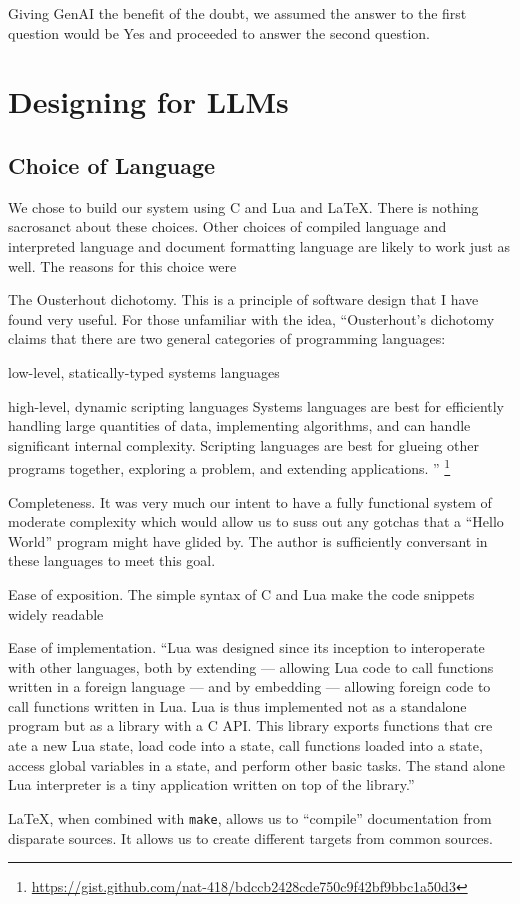 \documentclass[letterpaper,12pt]{article}
\begin{document}
{Giving GenAI the benefit of the doubt, we assumed the answer to the first
question would be Yes and proceeded to answer the second question. 

\section{Designing for LLMs}

\subsection{Choice of Language}

We chose to build our system using C and Lua and \LaTeX.  
There is nothing sacrosanct about these choices. Other 
choices of compiled language and interpreted
language and document formatting language are likely to work just as well. 
The reasons for this choice were
\be
\item The Ousterhout dichotomy. This is a principle of software design that I
  have found very useful. For those unfamiliar with the idea, 
``Ousterhout's dichotomy claims that there are two general categories of programming languages:
\be
\item low-level, statically-typed systems languages
\item high-level, dynamic scripting languages
  \ee
Systems languages are best for efficiently handling large quantities of data, implementing algorithms, and can handle significant internal complexity. Scripting languages are best for glueing other programs together, exploring a problem, and extending applications.
''
\footnote{\url{https://gist.github.com/nat-418/bdccb2428cde750c9f42bf9bbc1a50d3}}

\item Completeness. 
It was very much our intent to
have a fully functional system of moderate complexity which would allow us to
suss out any gotchas that a ``Hello World'' program might have glided by.
The author is sufficiently conversant in these languages to meet this goal.

\item Ease of exposition. 
  The simple syntax of C and Lua make the code snippets widely
  readable
\item Ease of implementation.
``Lua was designed since its inception to interoperate with
other languages, both by extending --- allowing Lua code to call functions
written in a foreign language --- and by embedding --- allowing foreign code to call functions written in Lua. Lua is
thus implemented not as a standalone
program but as a library with a C API.
This library exports functions that cre ate a new Lua state, load code into a
state, call functions loaded into a state,
access global variables in a state, and
perform other basic tasks. The stand alone Lua interpreter is a tiny application
written on top of the library.'' \cite{Lua2019}
\item \LaTeX, when combined with {\tt make}, allows us to ``compile''
  documentation from disparate sources. It allows us to create 
  different targets from common sources. 
\ee



}
\end{document}
